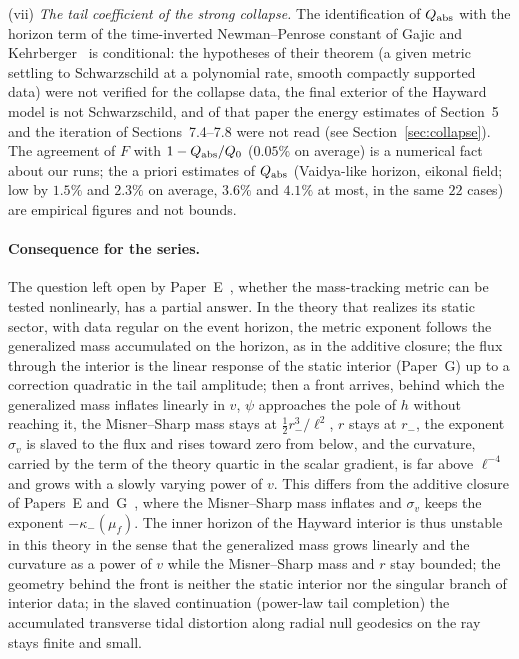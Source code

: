 \documentclass[11pt]{article}
\begin{document}
(vii) \emph{The tail coefficient of the strong collapse.} The identification of $Q_{\rm abs}$ with the horizon term of the time-inverted Newman--Penrose constant of Gajic and Kehrberger~\citeyearpar{GajicKehrberger2025} is conditional: the hypotheses of their theorem (a given metric settling to Schwarzschild at a polynomial rate, smooth compactly supported data) were not verified for the collapse data, the final exterior of the Hayward model is not Schwarzschild, and of that paper the energy estimates of Section~5 and the iteration of Sections~7.4--7.8 were not read (see Section~\ref{sec:collapse}). The agreement of $F$ with $1-Q_{\rm abs}/Q_0$ ($0.05\%$ on average) is a numerical fact about our runs; the a priori estimates of $Q_{\rm abs}$ (Vaidya-like horizon, eikonal field; low by $1.5\%$ and $2.3\%$ on average, $3.6\%$ and $4.1\%$ at most, in the same $22$ cases) are empirical figures and not bounds.

\paragraph{Consequence for the series.} The question left open by Paper~E~\citep{PaperE}, whether the mass-tracking metric can be tested nonlinearly, has a partial answer. In the theory that realizes its static sector, with data regular on the event horizon, the metric exponent follows the generalized mass accumulated on the horizon, as in the additive closure; the flux through the interior is the linear response of the static interior (Paper~G) up to a correction quadratic in the tail amplitude; then a front arrives, behind which the generalized mass inflates linearly in $v$, $\psi$ approaches the pole of $h$ without reaching it, the Misner--Sharp mass stays at $\tfrac12r_-^{3}/\ell^{2}$, $r$ stays at $r_-$, the exponent $\sigma_v$ is slaved to the flux and rises toward zero from below, and the curvature, carried by the term of the theory quartic in the scalar gradient, is far above $\ell^{-4}$ and grows with a slowly varying power of $v$. This differs from the additive closure of Papers~E and~G~\citep{PaperE,PaperG}, where the Misner--Sharp mass inflates and $\sigma_v$ keeps the exponent $-\kappa_-(\mu_f)$. The inner horizon of the Hayward interior is thus unstable in this theory in the sense that the generalized mass grows linearly and the curvature as a power of $v$ while the Misner--Sharp mass and $r$ stay bounded; the geometry behind the front is neither the static interior nor the singular branch of interior data; in the slaved continuation (power-law tail completion) the accumulated transverse tidal distortion along radial null geodesics on the ray stays finite and small.
\end{document}
